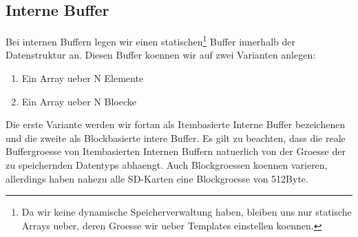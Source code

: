 \documentclass[10pt,a4paper]{article}
\begin{document}
\subsection{Interne Buffer}
Bei internen Buffern legen wir einen statischen\footnote{Da wir keine dynamische Speicherverwaltung haben, bleiben uns nur statische Arrays ueber, deren Groesse wir ueber Templates einstellen koennen.} Buffer innerhalb der Datenstruktur an. Diesen Buffer koennen wir auf zwei Varianten anlegen:
\begin{enumerate}
\item Ein Array ueber N Elemente
\item Ein Array ueber N Bloecke
\end{enumerate}
Die erste Variante werden wir fortan als Itembasierte Interne Buffer bezeichenen und die zweite als Blockbasierte intere Buffer. Es gilt zu beachten, dass die reale Buffergroesse von Itembasierten Internen Buffern natuerlich von der Groesse der zu speichernden Datentyps abhaengt. Auch Blockgroessen koennen varieren, allerdings haben nahezu alle SD-Karten eine Blockgroesse von 512Byte.
\end{document}
